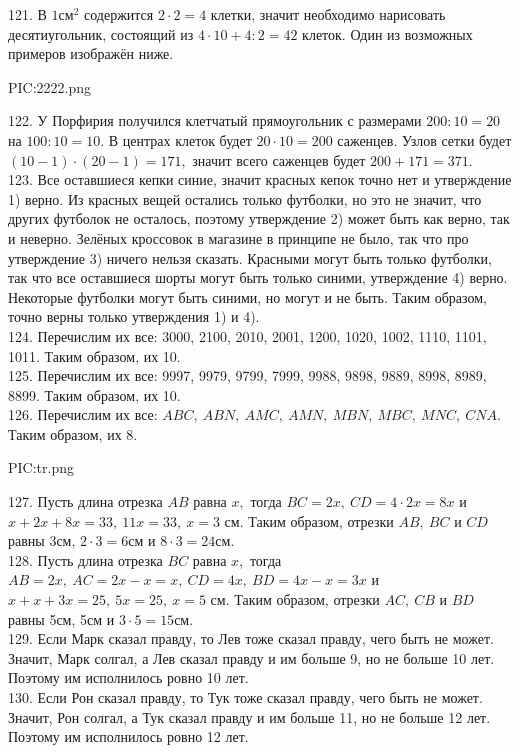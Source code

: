 121. В $1\text{см}^2$ содержится $2\cdot2=4$ клетки, значит необходимо нарисовать десятиугольник, состоящий из $4\cdot10+4:2=42$ клеток. Один из возможных примеров изображён ниже.
\begin{center}
{{PIC:2222.png}}
\end{center}
122. У Порфирия получился клетчатый прямоугольник с размерами $200:10=20$ на $100:10=10.$ В центрах клеток будет $20\cdot10=200$ саженцев. Узлов сетки будет $(10-1)\cdot(20-1)=171,$ значит всего саженцев будет $200+171=371.$\\
123. Все оставшиеся кепки синие, значит красных кепок точно нет и утверждение 1) верно. Из красных вещей остались только футболки, но это не значит, что других футболок не осталось, поэтому утверждение 2) может быть как верно, так и неверно. Зелёных кроссовок в магазине в принципе не было, так что про утверждение 3) ничего нельзя сказать. Красными могут быть только футболки, так что все оставшиеся шорты могут быть только синими, утверждение 4) верно. Некоторые футболки могут быть синими, но могут и не быть. Таким образом, точно верны только утверждения 1) и 4).\\
124. Перечислим их все: 3000, 2100, 2010, 2001, 1200, 1020, 1002, 1110, 1101, 1011. Таким образом, их 10.\\
125. Перечислим их все: 9997, 9979, 9799, 7999, 9988, 9898, 9889, 8998, 8989, 8899. Таким образом, их 10.\\
126. Перечислим их все: $ABC,\ ABN,\ AMC,\ AMN,\ MBN,\ MBC,\ MNC,\ CNA.$ Таким образом, их 8.
\begin{center}
{{PIC:tr.png}}
\end{center}
127.  Пусть длина отрезка $AB$ равна $x,$ тогда $BC=2x,\ CD=4\cdot2x=8x$ и $x+2x+8x=33,\ 11x=33,\ x=3$ см. Таким образом, отрезки $AB,\ BC$ и $CD$ равны 3см, $2\cdot3=6$см и $8\cdot3=24$см.\\
128. Пусть длина отрезка $BC$ равна $x,$ тогда $AB=2x,\ AC=2x-x=x,\ CD=4x,\ BD=4x-x=3x$ и $x+x+3x=25,\ 5x=25,\ x=5$ см. Таким образом, отрезки $AC,\ CB$ и $BD$ равны 5см, 5см и $3\cdot5=15$см.\\
129. Если Марк сказал правду, то Лев тоже сказал правду, чего быть не может. Значит, Марк солгал, а Лев сказал правду и им больше 9, но не больше 10 лет. Поэтому им исполнилось ровно 10 лет.\\
130. Если Рон сказал правду, то Тук тоже сказал правду, чего быть не может. Значит, Рон солгал, а Тук сказал правду и им больше 11, но не больше 12 лет. Поэтому им исполнилось ровно 12 лет.\\
